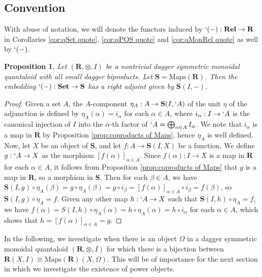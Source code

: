 \documentclass[12pt]{tac}
\newtheorem{proposition}[theorem]{Proposition}
\theoremstyle{definition}
\theoremstyle{remark}
\newcommand{\<}{\langle}
\renewcommand{\>}{\rangle}
\renewcommand{\:}{\colon}
\begin{document}
\subsection{Convention}
With abuse of notation, we will denote the functors induced by $`(-):\mathbf{Rel}\to\mathbf R$ in Corollaries \ref{cor:qSet quote}, \ref{cor:qPOS quote} and \ref{cor:qMonRel quote} as well by $`(-)$. 



\begin{proposition}
    Let $(\mathbf R,\otimes,I)$ be a nontrivial dagger symmetric monoidal quantaloid with all small dagger biproducts. Let $\mathbf S=\mathrm{Maps}(\mathbf R)$. Then the embedding $`(-):\mathbf{Set}\to\mathbf S$ has a right adjoint given by $\mathbf S(I,-)$. 
\end{proposition}
\begin{proof}
Given a set $A$, the $A$-component $\eta_A:A\to\mathbf S(I,`A)$ of the unit $\eta$ of the adjunction is defined by $\eta_A(\alpha)=i_\alpha$ for each $\alpha\in A$, where $i_\alpha:I\to`A$ is the canonical injection of $I$ into the $\alpha$-th factor of $`A=\bigoplus_{\alpha\in A}I_\alpha$. We note that $i_\alpha$ is a map in $\mathbf R$ by Proposition \ref{prop:coproducts of Maps}, hence $\eta_A$ is well defined. Now, let $X$ be an object of $\mathbf S$, and let $f:A\to\mathbf S(I,X)$ be a function.  We define $g:`A\to X$ as the morphism $[f(\alpha)]_{\alpha\in A}$. Since $f(\alpha):I\to X$ is a map in $\mathbf R$ for each $\alpha\in A$, it follows from Proposition \ref{prop:coproducts of Maps} that $g$ is a map in $\mathbf R$, so a morphism in $\mathbf S$. Then for each $\beta\in A$, we have $\mathbf S(I,g)\circ\eta_A(\beta)=g\circ\eta_A(\beta)=g\circ i_\beta=[f(\alpha)]_{\alpha\in A}\circ i_\beta=f(\beta)$, so $\mathbf S(I,g)\circ\eta_A=f$.
Given any other map $h:`A\to X$ such that $\mathbf S(I,h)\circ\eta_A=f$, we have $f(\alpha)=S(I,h)\circ\eta_A(\alpha)=h\circ\eta_A(\alpha)=h\circ i_\alpha$ for each $\alpha\in A$, which shows that $h=[f(\alpha)]_{\alpha\in A}=g$.
\end{proof}

In the following, we investigate when there is an object $\Omega$ in a dagger symmetric monoidal quantaloid $(\mathbf R,\otimes,I)$ for which there is a bijection between $\mathbf{R}(X,I)\cong \mathrm{Maps}(\mathbf R)(X,\Omega)$. This will be of importance for the next section in which we investigate the existence of power objects. 
\end{document}

